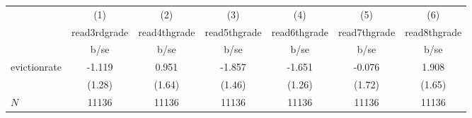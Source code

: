 {
\def\sym#1{\ifmmode^{#1}\else\(^{#1}\)\fi}
\begin{tabular}{l*{6}{c}}
\hline\hline
            &\multicolumn{1}{c}{(1)}           &\multicolumn{1}{c}{(2)}           &\multicolumn{1}{c}{(3)}           &\multicolumn{1}{c}{(4)}           &\multicolumn{1}{c}{(5)}           &\multicolumn{1}{c}{(6)}           \\
            &\multicolumn{1}{c}{read3rdgrade}  &\multicolumn{1}{c}{read4thgrade}  &\multicolumn{1}{c}{read5thgrade}  &\multicolumn{1}{c}{read6thgrade}  &\multicolumn{1}{c}{read7thgrade}  &\multicolumn{1}{c}{read8thgrade}  \\
            &                     b/se         &                     b/se         &                     b/se         &                     b/se         &                     b/se         &                     b/se         \\
\hline
evictionrate&                   -1.119         &                    0.951         &                   -1.857         &                   -1.651         &                   -0.076         &                    1.908         \\
            &                   (1.28)         &                   (1.64)         &                   (1.46)         &                   (1.26)         &                   (1.72)         &                   (1.65)         \\
\hline
\(N\)       &                    11136         &                    11136         &                    11136         &                    11136         &                    11136         &                    11136         \\
\hline\hline
\end{tabular}
}
